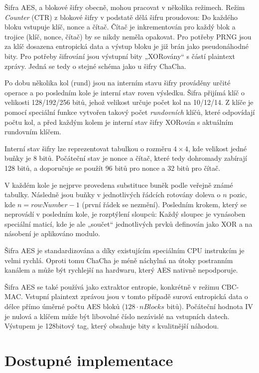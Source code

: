 \documentclass[a4paper,12pt]{article}
\begin{document}
	Šifra AES, a blokové šifry obecně, mohou pracovat v několika režimech. Režim \textit{Counter} (CTR) z blokové šifry v podstatě dělá šifru proudovou: Do každého bloku vstupuje klíč, nonce a čítač. Čítač je inkrementován pro každý blok a trojice (klíč, nonce, čítač) by se nikdy neměla opakovat. Pro potřeby PRNG jsou za klíč dosazena entropická data a výstup bloku je již brán jako pseudonáhodné bity. Pro potřeby šifrování jsou výstupní bity „XORovány“ s částí plaintext zprávy. Jedná se tedy o stejné schéma jako u šifry ChaCha.
	
	Po dobu několika kol (rund) jsou na interním stavu šifry prováděny určité operace a po posledním kole je interní stav roven výsledku. Šifra přijímá klíč o velikosti 128/192/256 bitů, jehož velikost určuje počet kol na 10/12/14. Z klíče je pomocí speciální funkce vytvořen takový počet \textit{rundovních} klíčů, které odpovídají počtu kol, a před každým kolem je interní stav šifry XORován s aktuálním rundovním klíčem.
	
	Interní stav šifry lze reprezentovat tabulkou o rozměru $4\times4$, kde velikost jedné buňky je 8 bitů. Počáteční stav je nonce a čítač, které tedy dohromady zabírají 128 bitů, a doporučuje se použít 96 bitů pro nonce a 32 bitů pro čítač.
	
	V každém kole je nejprve provedena substituce buněk podle veřejně známé tabulky. Následně jsou buňky v jednotlivých řádcích rotovány doleva o $n$ pozic, kde $n=rowNumber-1$ (první řádek se nezmění). Posledním krokem, který se neprovádí v posledním kole, je rozptýlení sloupců: Každý sloupec je vynásoben speciální maticí, kde je ale „součet“ jednotlivých prvků definován jako XOR a na násobení je aplikováno modulo.%
		
	Šifra AES je standardizována a díky existujícím speciálním CPU instrukcím je velmi rychlá. Oproti tomu ChaCha je méně náchylná na útoky postranním kanálem a může být rychlejší na hardwaru, který AES nativně nepodporuje.
	
	Šifra AES se také používá jako extraktor entropie, konkrétně v režimu CBC-MAC. Vstupní plaintext zprávou jsou v tomto případě surová entropická data o délce přímo úměrné počtu AES bloků ($128\cdot nBlocks$ bitů). Počáteční hodnota IV je nulová a klíčem může být libovolné číslo nezávislé na vstupních datech. Výstupem je 128bitový tag, který obsahuje bity s kvalitnější náhodou.
	
	\section{Dostupné implementace}
	
\end{document}
